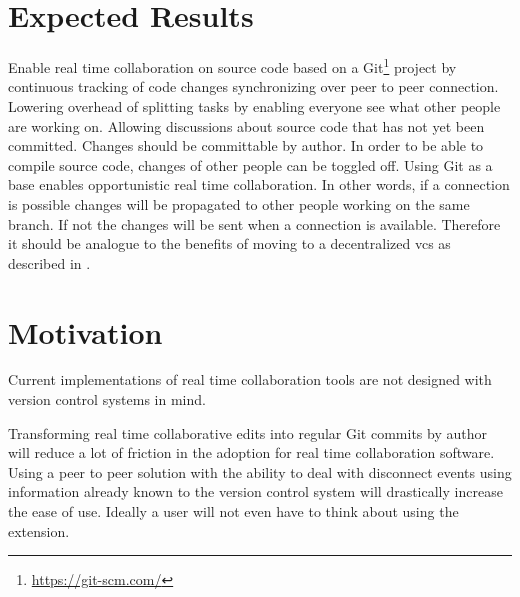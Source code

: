 \section{Expected Results}

Enable real time collaboration on source code based on a Git\footnote{\href{https://git-scm.com/}{https://git-scm.com/}} project by
continuous tracking of code changes synchronizing over peer to peer connection.
Lowering overhead of splitting tasks by enabling everyone see what other people are working on. Allowing discussions about source code that has not yet been committed.
Changes should be committable by author. In order to be able to compile source code, changes of other people can be toggled off.
Using Git as a base enables opportunistic real time collaboration. In other words, if a connection is possible changes will be propagated  to other people working on the same branch. If not the changes will be sent when a connection is available. \cite{6188603} Therefore it should be analogue to the benefits of moving to a decentralized vcs as described in \cite{AlwisSillito:2009:centralToDecentralVCS}.

\section{Motivation}

Current implementations of real time collaboration tools are not designed with version control systems in mind.

Transforming real time collaborative edits into regular Git commits by author will reduce a lot of friction in the adoption for real time collaboration software. Using a peer to peer solution with the ability to deal with disconnect events using information already known to the version control system will drastically increase the ease of use. Ideally a user will not even have to think about using the extension.